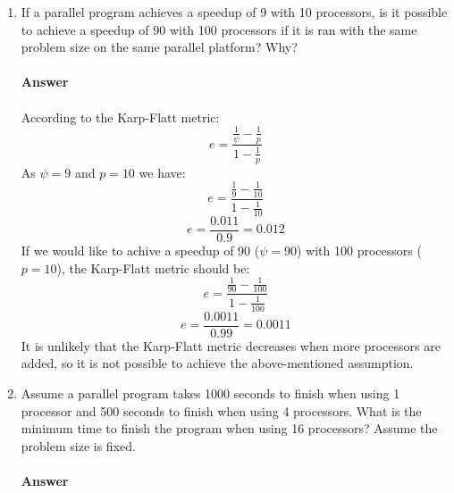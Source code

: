 \documentclass[10pt]{scrartcl}
\begin{document}
\begin{enumerate}
 
 \item If a parallel program achieves a speedup of 9 with 10 processors, is it possible to achieve a speedup of 90 with 100 processors if it is ran with the same problem size on the same parallel platform? Why?\\
 \\ 
 \textbf{Answer}\\
 \\
 According to the Karp-Flatt metric:
 $$e=\frac{\frac{1}{\psi}-\frac{1}{p}}{1-\frac{1}{p}}$$
 As $\psi=9$ and $p=10$ we have:
 $$e=\frac{\frac{1}{9}-\frac{1}{10}}{1-\frac{1}{10}}$$
 $$e=\frac{0.011}{0.9} = 0.012$$
 If we would like to achive a speedup of 90 ($\psi=90$) with 100 processors ($p=10$), the Karp-Flatt metric should be:
 $$e=\frac{\frac{1}{90}-\frac{1}{100}}{1-\frac{1}{100}}$$
 $$e=\frac{0.0011}{0.99} = 0.0011$$
 It is unlikely that the Karp-Flatt metric decreases when more processors are added, so it is not possible to achieve the above-mentioned assumption.
 
 \item Assume a parallel program takes 1000 seconds to finish when using 1 processor and 500 seconds to finish when using 4 processors. What is the minimum time to finish the program when using 16 processors? Assume the problem size is fixed.\\
 \\ 
 \textbf{Answer}\\
 \\
 

\end{enumerate}
\end{document}
